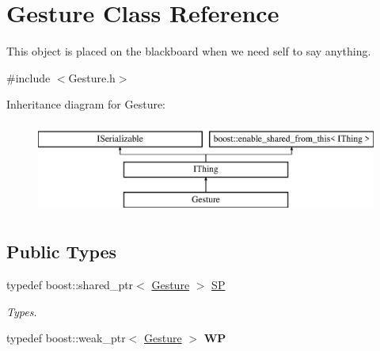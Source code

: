 \hypertarget{class_gesture}{}\section{Gesture Class Reference}
\label{class_gesture}


This object is placed on the blackboard when we need self to say anything.  




{\ttfamily \#include $<$Gesture.\+h$>$}

Inheritance diagram for Gesture\+:\begin{figure}[H]
\begin{center}
\leavevmode
\includegraphics[height=3.000000cm]{class_gesture}
\end{center}
\end{figure}
\subsection*{Public Types}
\begin{DoxyCompactItemize}
\item 
\mbox{\label{class_gesture_a33ef75f98bf7b23f861e031e23da0a9f}} 
typedef boost\+::shared\+\_\+ptr$<$ \hyperlink{class_gesture}{Gesture} $>$ \hyperlink{class_gesture_a33ef75f98bf7b23f861e031e23da0a9f}{SP}
\begin{DoxyCompactList}\small\item\em Types. \end{DoxyCompactList}\item 
\mbox{\label{class_gesture_aaa739c72bb83c940b5f1bd57f9eb11e8}} 
typedef boost\+::weak\+\_\+ptr$<$ \hyperlink{class_gesture}{Gesture} $>$ {\bfseries WP}
\end{DoxyCompactItemize}
